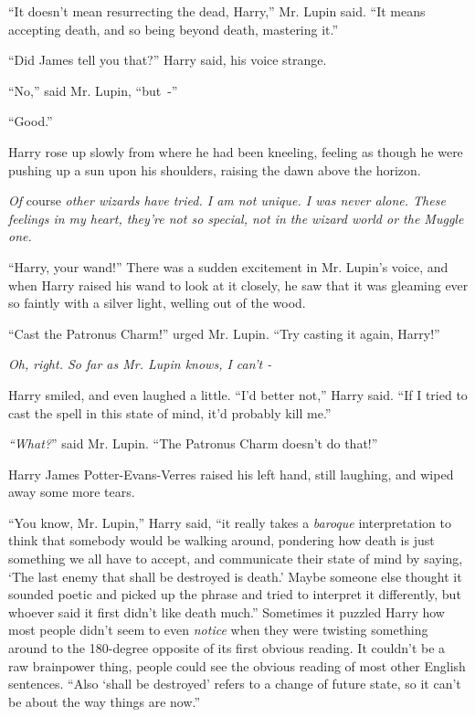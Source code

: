 ``It doesn't mean resurrecting the dead, Harry,'' Mr. Lupin said. ``It means accepting death, and so being beyond death, mastering it.''

``Did James tell you that?'' Harry said, his voice strange.

``No,'' said Mr. Lupin, ``but~-''

``Good.''

Harry rose up slowly from where he had been kneeling, feeling as though he were pushing up a sun upon his shoulders, raising the dawn above the horizon.

\emph{Of} course \emph{other wizards have tried. I am not unique. I was never alone. These feelings in my heart, they're not so special, not in the wizard world or the Muggle one.}

``Harry, your wand!'' There was a sudden excitement in Mr. Lupin's voice, and when Harry raised his wand to look at it closely, he saw that it was gleaming ever so faintly with a silver light, welling out of the wood.

``Cast the Patronus Charm!'' urged Mr. Lupin. ``Try casting it again, Harry!''

\emph{Oh, right. So far as Mr. Lupin knows, I can't -}

Harry smiled, and even laughed a little. ``I'd better not,'' Harry said. ``If I tried to cast the spell in this state of mind, it'd probably kill me.''

\emph{``What?}'' said Mr. Lupin. ``The Patronus Charm doesn't do that!''

Harry James Potter-Evans-Verres raised his left hand, still laughing, and wiped away some more tears.

``You know, Mr. Lupin,'' Harry said, ``it really takes a \emph{baroque} interpretation to think that somebody would be walking around, pondering how death is just something we all have to accept, and communicate their state of mind by saying, `The last enemy that shall be destroyed is death.' Maybe someone else thought it sounded poetic and picked up the phrase and tried to interpret it differently, but whoever said it first didn't like death much.'' Sometimes it puzzled Harry how most people didn't seem to even \emph{notice} when they were twisting something around to the 180-degree opposite of its first obvious reading. It couldn't be a raw brainpower thing, people could see the obvious reading of most other English sentences. ``Also `shall be destroyed' refers to a change of future state, so it can't be about the way things are now.''

